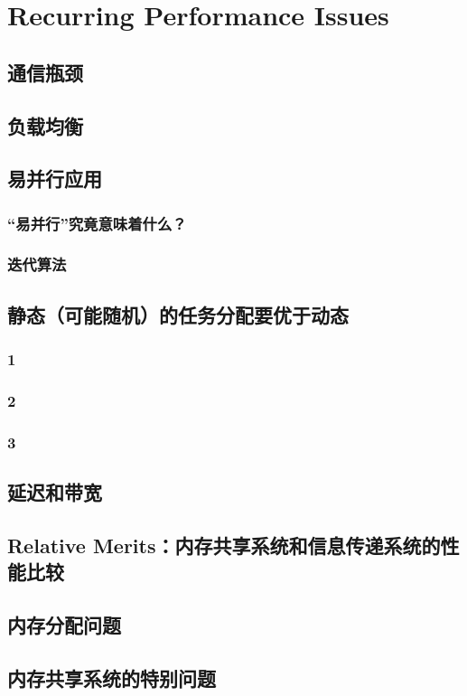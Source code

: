 ﻿\chapter{Recurring Performance Issues}
\label{chap:issues}
\section{通信瓶颈}

\section{负载均衡}

\section{易并行应用}
\label{embpar}

\subsection{``易并行''究竟意味着什么？}

\subsection{迭代算法}

\section{静态（可能随机）的任务分配要优于动态}

\subsection{1}
\subsection{2}
\subsection{3}
\label{mutlinks}


\section{延迟和带宽}

\section{Relative Merits：内存共享系统和信息传递系统的性能比较}

\section{内存分配问题}

\section{内存共享系统的特别问题}
